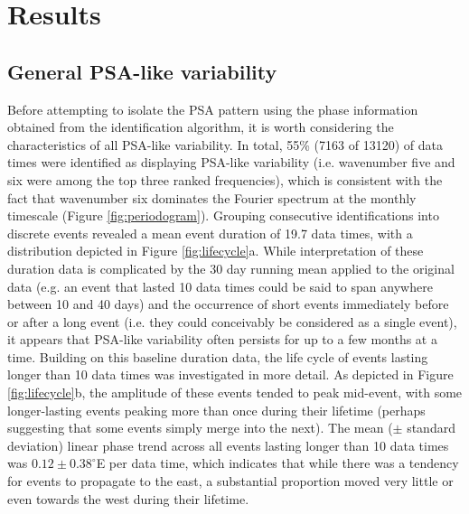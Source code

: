
\section{Results}

\subsection{General PSA-like variability}

Before attempting to isolate the PSA pattern using the phase information obtained from the identification algorithm, it is worth considering the characteristics of all PSA-like variability. In total, 55\% (7163 of 13120) of data times were identified as displaying PSA-like variability (i.e. wavenumber five and six were among the top three ranked frequencies), which is consistent with the fact that wavenumber six dominates the Fourier spectrum at the monthly timescale (Figure \ref{fig:periodogram}). Grouping consecutive identifications into discrete events revealed a mean event duration of 19.7 data times, with a distribution depicted in Figure \ref{fig:lifecycle}a. While interpretation of these duration data is complicated by the 30 day running mean applied to the original data (e.g. an event that lasted 10 data times could be said to span anywhere between 10 and 40 days) and the occurrence of short events immediately before or after a long event (i.e. they could conceivably be considered as a single event), it appears that PSA-like variability often persists for up to a few months at a time. Building on this baseline duration data, the life cycle of events lasting longer than 10 data times was investigated in more detail. As depicted in Figure \ref{fig:lifecycle}b, the amplitude of these events tended to peak mid-event, with some longer-lasting events peaking more than once during their lifetime (perhaps suggesting that some events simply merge into the next). The mean ($\pm$ standard deviation) linear phase trend across all events lasting longer than 10 data times was $0.12 \pm 0.38^{\circ}$E per data time, which indicates that while there was a tendency for events to propagate to the east, a substantial proportion moved very little or even towards the west during their lifetime. 

